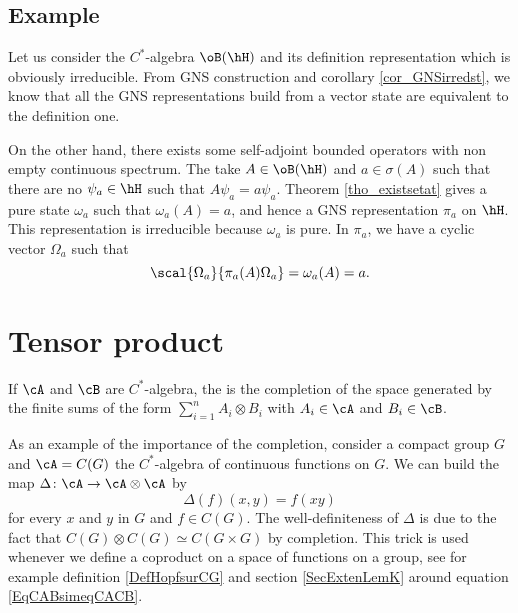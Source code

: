 \subsection{Example}

Let us consider the $C^*$-algebra $\oB(\hH)$ and its definition representation which is obviously irreducible. From GNS construction and corollary \ref{cor_GNSirredst}, we know that all the GNS representations build from a vector state are equivalent to the definition one.

On the other hand, there exists some self-adjoint bounded operators with non empty continuous spectrum. The take $A\in\oB(\hH)$ and $a\in\sigma(A)$ such that there are no $\psi_a\in\hH$ such that $A\psi_a=a\psi_a$. Theorem \ref{tho_existsetat} gives a pure state $\omega_a$ such that $\omega_a(A)=a$, and hence a GNS representation $\pi_a$ on $\hH$. This representation is irreducible because $\omega_a$ is pure. In $\pi_a$, we have  a cyclic vector $\Omega_a$ such that
\[ 
  \scal{\Omega_a}{\pi_a(A)\Omega_a}=\omega_a(A)=a.
\]

\section{Tensor product}            \label{SecTensProdCSA}

If $\cA$ and $\cB$ are $C^*$-algebra, the  is the completion of the space generated by the finite sums of the form $\sum_{i=1}^n A_i\otimes B_i$ with $A_i\in\cA$ and $B_i\in\cB$.

As an example of the importance of the completion, consider a compact group $G$ and $\cA=C(G)$ the $C^*$-algebra of continuous functions on $G$. We can build the map $\Delta\colon \cA\to \cA\otimes \cA$ by
\begin{equation}
    \Delta(f)(x,y)=f(xy)
\end{equation}
for every $x$ and $y$ in $G$ and $f\in C(G)$. The well-definiteness of $\Delta$ is due to the fact that $C(G)\otimes C(G)\simeq C(G\times G)$ by completion. This trick is used whenever we define a coproduct on a space of functions on a group, see for example definition \ref{DefHopfsurCG} and section \ref{SecExtenLemK} around equation \eqref{EqCABsimeqCACB}.

